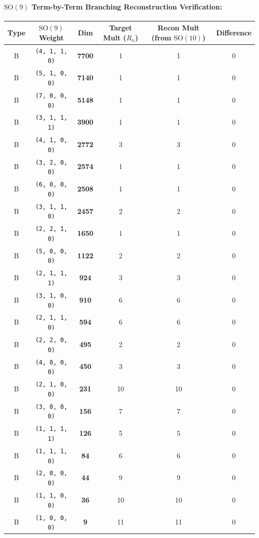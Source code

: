 \documentclass[11pt,a4paper]{article}
\begin{document}
\paragraph{$\mathrm{SO}(9)$ Term-by-Term Branching Reconstruction Verification:}
\begin{longtable}{@{}cccccc@{}}
\toprule
Type & $\mathrm{SO}(9)$ Weight & Dim & Target Mult ($R_n$) & Recon Mult (from $\mathrm{SO}(10)$) & Difference \\
\midrule
\endhead
B & \texttt{(4, 1, 1, 0)} & \textbf{7700} & 1 & 1 & 0 \\
B & \texttt{(5, 1, 0, 0)} & \textbf{7140} & 1 & 1 & 0 \\
B & \texttt{(7, 0, 0, 0)} & \textbf{5148} & 1 & 1 & 0 \\
B & \texttt{(3, 1, 1, 1)} & \textbf{3900} & 1 & 1 & 0 \\
B & \texttt{(4, 1, 0, 0)} & \textbf{2772} & 3 & 3 & 0 \\
B & \texttt{(3, 2, 0, 0)} & \textbf{2574} & 1 & 1 & 0 \\
B & \texttt{(6, 0, 0, 0)} & \textbf{2508} & 1 & 1 & 0 \\
B & \texttt{(3, 1, 1, 0)} & \textbf{2457} & 2 & 2 & 0 \\
B & \texttt{(2, 2, 1, 0)} & \textbf{1650} & 1 & 1 & 0 \\
B & \texttt{(5, 0, 0, 0)} & \textbf{1122} & 2 & 2 & 0 \\
B & \texttt{(2, 1, 1, 1)} & \textbf{924} & 3 & 3 & 0 \\
B & \texttt{(3, 1, 0, 0)} & \textbf{910} & 6 & 6 & 0 \\
B & \texttt{(2, 1, 1, 0)} & \textbf{594} & 6 & 6 & 0 \\
B & \texttt{(2, 2, 0, 0)} & \textbf{495} & 2 & 2 & 0 \\
B & \texttt{(4, 0, 0, 0)} & \textbf{450} & 3 & 3 & 0 \\
B & \texttt{(2, 1, 0, 0)} & \textbf{231} & 10 & 10 & 0 \\
B & \texttt{(3, 0, 0, 0)} & \textbf{156} & 7 & 7 & 0 \\
B & \texttt{(1, 1, 1, 1)} & \textbf{126} & 5 & 5 & 0 \\
B & \texttt{(1, 1, 1, 0)} & \textbf{84} & 6 & 6 & 0 \\
B & \texttt{(2, 0, 0, 0)} & \textbf{44} & 9 & 9 & 0 \\
B & \texttt{(1, 1, 0, 0)} & \textbf{36} & 10 & 10 & 0 \\
B & \texttt{(1, 0, 0, 0)} & \textbf{9} & 11 & 11 & 0 \\

\end{longtable}
\end{document}
